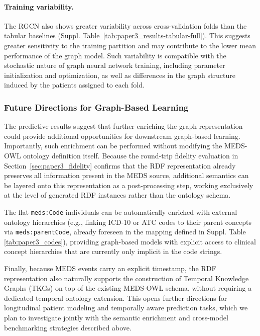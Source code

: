 \paragraph{Training variability.} The RGCN also shows greater variability across cross-validation folds than the tabular baselines (Suppl. Table~\ref{tab:paper3_results-tabular-full}). This suggests greater sensitivity to the training partition and may contribute to the lower mean performance of the graph model. Such variability is compatible with the stochastic nature of graph neural network training, including parameter initialization and optimization, as well as differences in the graph structure induced by the patients assigned to each fold.


\subsubsection{Future Directions for Graph-Based Learning}
The predictive results suggest that further enriching the graph representation could provide additional opportunities for downstream graph-based learning. Importantly, such enrichment can be performed without modifying the MEDS-OWL ontology definition itself. Because the round-trip fidelity evaluation in Section~\ref{sec:paper3_fidelity} confirms that the RDF representation already preserves all information present in the MEDS source, additional semantics can be layered onto this representation as a post-processing step, working exclusively at the level of generated RDF instances rather than the ontology schema.

The flat \texttt{meds:Code} individuals can be automatically enriched with external ontology hierarchies (e.g., linking ICD-10 or ATC codes to their parent concepts via \texttt{meds:parentCode}, already foreseen in the mapping defined in Suppl. Table \ref{tab:paper3_codes}), providing graph-based models with explicit access to clinical concept hierarchies that are currently only implicit in the code strings. 

Finally, because MEDS events carry an explicit timestamp, the RDF representation also naturally supports the construction of Temporal Knowledge Graphs (TKGs) on top of the existing MEDS-OWL schema, without requiring a dedicated temporal ontology extension. This opens further directions for longitudinal patient modeling and temporally aware prediction tasks, which we plan to investigate jointly with the semantic enrichment and cross-model benchmarking strategies described above.

